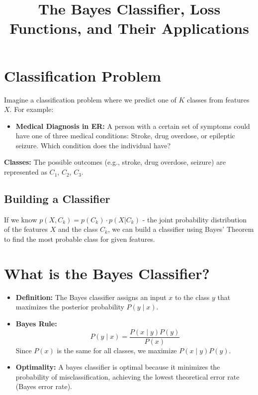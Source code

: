 \documentclass[12pt]{article}
\title{The Bayes Classifier, Loss Functions, and Their Applications}
\author{}
\date{}
\begin{document}
\maketitle

\section{Classification Problem}

Imagine a classification problem where we predict one of $K$ classes from features $X$. For example:

\begin{itemize}
    \item \textbf{Medical Diagnosis in ER:} A person with a certain set of symptoms could have one of three medical conditions: Stroke, drug overdose, or epileptic seizure. Which condition does the individual have?
\end{itemize}

\textbf{Classes:} The possible outcomes (e.g., stroke, drug overdose, seizure) are represented as $C_1$, $C_2$, $C_3$.

\subsection{Building a Classifier}

If we know $p(X, C_k) =  p(C_k) \cdot p(X | C_k)$ - the joint probability distribution of the features $X$ and the class $C_k$, we can build a classifier using Bayes' Theorem to find the most probable class for given features.

\section{What is the Bayes Classifier?}

\begin{itemize}
    \item \textbf{Definition:} The Bayes classifier assigns an input $x$ to the class $y$ that maximizes the posterior probability $P(y \mid x)$.
    \item \textbf{Bayes Rule:}
    \[
    P(y \mid x) = \frac{P(x \mid y)P(y)}{P(x)}
    \]
    Since $P(x)$ is the same for all classes, we maximize $P(x \mid y)P(y)$.
    \item \textbf{Optimality:} A bayes classifier is optimal because it minimizes the probability of misclassification, achieving the lowest theoretical error rate (Bayes error rate).
\end{itemize}
\end{document}

